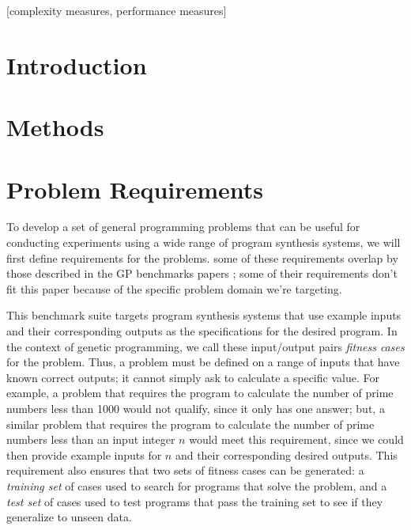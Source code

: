 \documentclass{sig-alternate}
\begin{document}
[complexity measures, performance measures]



\section{Introduction}



\section{Methods}


\section{Problem Requirements} \label{requirements}

To develop a set of general programming problems that can be useful for conducting experiments using a wide range of program synthesis systems, we will first define requirements for the problems. some of these requirements overlap by those described in the GP benchmarks papers \cite{McDermott:2012:GECCO, White:2013:BGB:2441218.2441242}; some of their requirements don't fit this paper because of the specific problem domain we're targeting.

This benchmark suite targets program synthesis systems that use example inputs and their corresponding outputs as the specifications for the desired program. In the context of genetic programming, we call these input/output pairs \textit{fitness cases} for the problem. Thus, a problem must be defined on a range of inputs that have known correct outputs; it cannot simply ask to calculate a specific value. For example, a problem that requires the program to calculate the number of prime numbers less than 1000 would not qualify, since it only has one answer; but, a similar problem that requires the program to calculate the number of prime numbers less than an input integer $n$ would meet this requirement, since we could then provide example inputs for $n$ and their corresponding desired outputs. This requirement also ensures that two sets of fitness cases can be generated: a \textit{training set} of cases used to search for programs that solve the problem, and a \textit{test set} of cases used to test programs that pass the training set to see if they generalize to unseen data.
\end{document}

